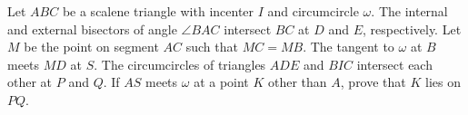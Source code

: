 Let $ABC$ be a scalene triangle with incenter $I$ and circumcircle $\omega$. The internal and external bisectors of angle $\angle BAC$ intersect $BC$ at $D$ and $E$,  respectively. Let $M$ be the point on segment $AC$ such that $MC = MB$. The tangent to  $\omega$ at $B$ meets $MD$ at $S$. The circumcircles of triangles $ADE$ and $BIC$ intersect each other at $P$ and $Q$. If $AS$ meets $\omega$ at a point $K$ other than $A$,  prove that $K$ lies on $PQ$.